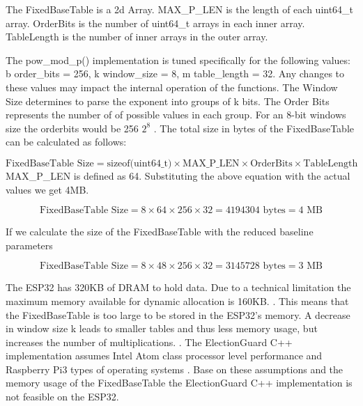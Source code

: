The FixedBaseTable is a 2d Array. MAX\_P\_LEN is the length of each uint64\_t array. OrderBits is the number of uint64\_t arrays in each inner array. TableLength is the number of inner arrays in the outer array. 


The pow\_mod\_p() implementation is tuned specifically for the following values: b order\_bits = 256, k window\_size = 8, m table\_length = 32. Any changes to these values may impact the internal operation of the functions. The Window Size determines to parse the exponent into groups of k bits. The Order Bits represents the number of of possible values in each group. For an 8-bit windows size the orderbits would be 256 \(2^8\) \cite[22]{eg-spec}. The total size in bytes of the FixedBaseTable can be calculated as follows:

\begin{equation}
    \text{FixedBaseTable Size} = \text{sizeof(uint64\_t)} \times \text{MAX\_P\_LEN} \times \text{OrderBits} \times \text{TableLength}
\end{equation}
MAX\_P\_LEN is defined as 64. Substituting the above equation with the actual values we get 4MB.

\begin{equation}
    \text{FixedBaseTable Size} = 8 \times 64 \times 256 \times 32 = 4194304 \text{ bytes} = 4 \text{ MB}
\end{equation}

If we calculate the size of the FixedBaseTable with the reduced baseline parameters

\begin{equation}
    \text{FixedBaseTable Size} = 8 \times 48 \times 256 \times 32 =  3145728 \text{ bytes} = 3 \text{ MB}
\end{equation}

The ESP32 has 320KB of DRAM to hold data. Due to a technical limitation the maximum memory available for dynamic allocation is 160KB. \cite{esp32-ref}. This means that the FixedBaseTable is too large to be stored in the ESP32's memory. A decrease in window size k leads to smaller tables and thus less memory usage, but increases the number of multiplications. \cite[22]{eg-spec}. The ElectionGuard C++ implementation assumes Intel Atom class processor level performance and Raspberry Pi3 types of operating systems \cite{eg-docs}. Base on these assumptions and the memory usage of the FixedBaseTable the ElectionGuard C++ implementation is not feasible on the ESP32.

